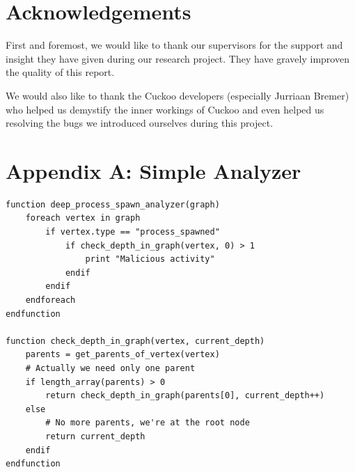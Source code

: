 \documentclass{scrartcl}
\begin{document}
\clearpage

\section*{Acknowledgements}

First and foremost, we would like to thank our supervisors for the support and insight they have given during our research project. They have gravely improven the quality of this report.

We would also like to thank the Cuckoo developers (especially Jurriaan Bremer) who helped us demystify the inner workings of Cuckoo and even helped us resolving the bugs we introduced ourselves during this project.

\clearpage





\clearpage
\section*{Appendix A: Simple Analyzer}

\begin{lstlisting}
function deep_process_spawn_analyzer(graph)
    foreach vertex in graph
        if vertex.type == "process_spawned"
            if check_depth_in_graph(vertex, 0) > 1
                print "Malicious activity"
            endif
        endif
    endforeach
endfunction

function check_depth_in_graph(vertex, current_depth)
    parents = get_parents_of_vertex(vertex)
    # Actually we need only one parent
    if length_array(parents) > 0
        return check_depth_in_graph(parents[0], current_depth++)
    else
        # No more parents, we're at the root node
        return current_depth
    endif
endfunction
\end{lstlisting}

\clearpage
\end{document}
